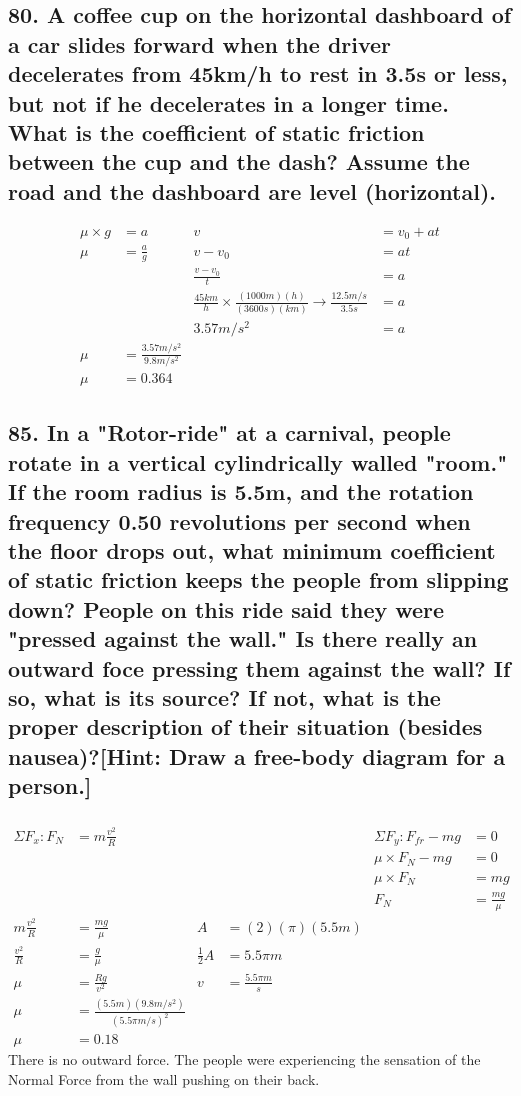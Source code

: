 \documentclass[12pt,a4paper,english]{article}
\begin{document}
\begin{flushleft}
  \subsection{80. A coffee cup on the horizontal dashboard of a car slides forward when the driver decelerates from 45km/h to rest in 3.5s or less, but not if he decelerates in a longer time. What is the coefficient of static friction between the cup and the dash? Assume the road and the dashboard are level (horizontal).}
  \begin{align*}
    \mu\times g&=a
               &v&=v_0+at
               \\
              \mu&=\frac{a}{g}&v-v_0&=at
               \\
               &&\frac{v-v_0}{t}&=a 
               \\
               && \frac{45km}{h}\times\frac{(1000m)(h)}{(3600s)(km)}\rightarrow\frac{12.5m/s}{3.5s}&=a
               \\
               &&3.57m/s^2&=a
               \\
    \mu&=\frac{3.57m/s^2}{9.8m/s^2}
    \\
    \mu&=0.364
  \end{align*}
  \subsection{85. In a "Rotor-ride" at a carnival, people rotate in a vertical cylindrically walled "room." If the room radius is 5.5m, and the rotation frequency 0.50 revolutions per second when the floor drops out, what minimum coefficient of static friction keeps the people from slipping down? People on this ride said they were "pressed against the wall." Is there really an outward foce pressing them against the wall? If so, what is its source? If not, what is the proper description of their situation (besides nausea)?[Hint: Draw a free-body diagram for a person.]}
  \begin{align*}
    &&&&&
    \\
    \Sigma F_x: F_N&=m\frac{v^2}{R}&&&\Sigma F_y: F_{fr}-mg&=0
    \\
    &&&&\mu\times F_N-mg&=0
    \\
       &&&&\mu \times F_N&=mg
    \\
    &&&&F_N&=\frac{mg}{\mu}
    \\
    m\frac{v^2}{R}&=\frac{mg}{\mu}
                 &A&=(2)(\pi)(5.5m)
    \\
    \frac{v^2}{R}&=\frac{g}{\mu}
    &\frac{1}{2}A&=5.5\pi m
    \\
    \mu&=\frac{Rg}{v^2}
    &v&=\frac{5.5\pi m}{s}
    \\
    \mu&=\frac{(5.5m)(9.8m/s^2)}{(5.5\pi m/s)^2}
    \\
    \mu&=0.18
  \end{align*}
  There is no outward force. The people were experiencing the sensation of the Normal Force from the wall pushing on their back.
\end{flushleft}
\end{document}
